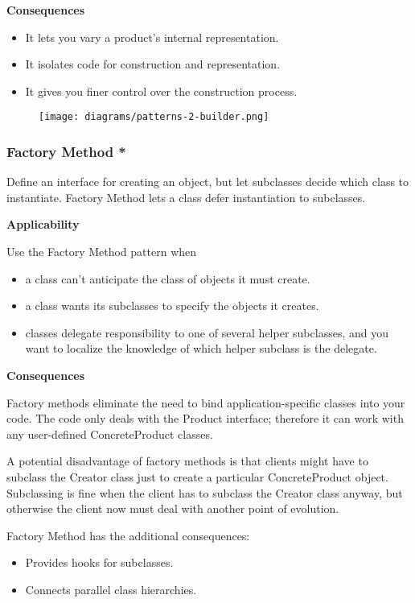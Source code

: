 \documentclass{article}
\begin{document}
\textbf{Consequences}
\begin{itemize}
    \item It lets you vary a product's internal representation.
    \item It isolates code for construction and representation.
    \item It gives you finer control over the construction process.
\end{itemize}

\begin{figure}[h]
    \centering
    \texttt{[image: diagrams/patterns-2-builder.png]}
\end{figure}



\newpage
\subsubsection{Factory Method *}
Define an interface for creating an object, but let subclasses decide which class to instantiate. Factory Method lets a class defer instantiation to subclasses.


\textbf{Applicability}

Use the Factory Method pattern when
\begin{itemize}
    \item a class can't anticipate the class of objects it must create.
    \item a class wants its subclasses to specify the objects it creates.
    \item classes delegate responsibility to one of several helper subclasses, and you want to localize the knowledge of which helper subclass is the delegate.
\end{itemize}

\textbf{Consequences}

Factory methods eliminate the need to bind application-specific classes into your code. The code only deals with the Product interface; therefore it can work with any user-defined ConcreteProduct classes.

A potential disadvantage of factory methods is that clients might have to subclass the Creator class just to create a particular ConcreteProduct object. Subclassing is fine when the client has to subclass the Creator class anyway, but otherwise the client now must deal with another point of evolution.

Factory Method has the additional consequences:
\begin{itemize}
    \item Provides hooks for subclasses.
    \item Connects parallel class hierarchies.
\end{itemize}
\end{document}
